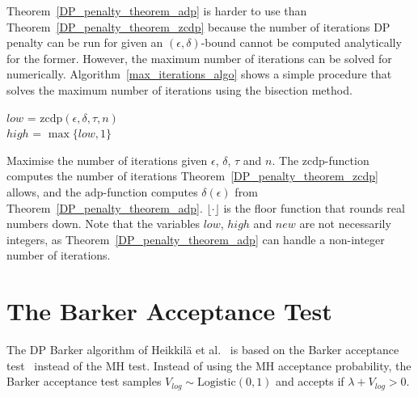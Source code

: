 \documentclass[english,twoside,openright]{HYgraduMLDS}
\begin{document}
Theorem~\ref{DP_penalty_theorem_adp} is harder to use than 
Theorem~\ref{DP_penalty_theorem_zcdp} because the number of iterations
DP penalty can be run for given an \((\epsilon, \delta)\)-bound cannot be 
computed analytically for the former. However, the maximum number of iterations 
can be solved for numerically. Algorithm~\ref{max_iterations_algo} shows a simple
procedure that solves the maximum number of iterations using the bisection
method.

\begin{algorithm}[H]\label{max_iterations_algo}
  \SetAlgoLined
	\(low\) = \(\mathrm{zcdp}(\epsilon, \delta, \tau, n)\) \\
  \(high\) = \(\max \{low, 1\}\) \\


  \caption{
    Maximise the number of iterations given \(\epsilon\), \(\delta\),
    \(\tau\) and \(n\). The
    \(\mathrm{zcdp}\)-function computes the number of iterations
    Theorem~\ref{DP_penalty_theorem_zcdp} allows, and the
    \(\mathrm{adp}\)-function computes \(\delta(\epsilon)\) from
    Theorem~\ref{DP_penalty_theorem_adp}. \(\lfloor \cdot \rfloor\) is the
    floor function that rounds real numbers down. Note that the variables
    \(low\), \(high\) and \(new\) are not necessarily integers, as
    Theorem~\ref{DP_penalty_theorem_adp} can handle a non-integer number of
    iterations.
  }
\end{algorithm}

\section{The Barker Acceptance Test}\label{dp_barker_section}

The DP Barker algorithm of Heikkilä et al.~\cite{HeikkilaJDH19} is based on
the Barker acceptance test~\cite{Barker65} instead of the MH test.
Instead of using the MH acceptance probability, the Barker acceptance test samples 
\(V_{log}\sim \mathrm{Logistic(0, 1)}\) and accepts if \(\lambda + V_{log} > 0\).
\end{document}
